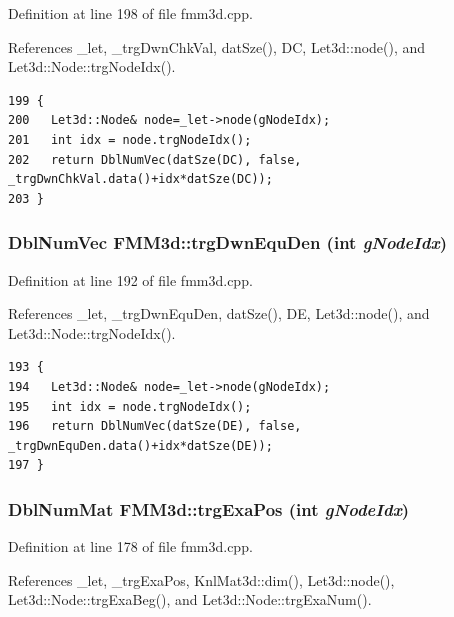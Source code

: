 Definition at line 198 of file fmm3d.cpp.

References \_\-let, \_\-trg\-Dwn\-Chk\-Val, dat\-Sze(), DC, Let3d::node(), and Let3d::Node::trg\-Node\-Idx().

\footnotesize\begin{verbatim}199 {
200   Let3d::Node& node=_let->node(gNodeIdx);
201   int idx = node.trgNodeIdx();
202   return DblNumVec(datSze(DC), false, _trgDwnChkVal.data()+idx*datSze(DC));
203 }
\end{verbatim}\normalsize 


\subsubsection{\setlength{\rightskip}{0pt plus 5cm}Dbl\-Num\-Vec FMM3d::trg\-Dwn\-Equ\-Den (int {\em g\-Node\-Idx})\hspace{0.3cm}{\tt  [protected]}}\label{classFMM3d_3dd1a2adae528cdd846d10c3caba3b98_3dd1a2adae528cdd846d10c3caba3b98}




Definition at line 192 of file fmm3d.cpp.

References \_\-let, \_\-trg\-Dwn\-Equ\-Den, dat\-Sze(), DE, Let3d::node(), and Let3d::Node::trg\-Node\-Idx().

\footnotesize\begin{verbatim}193 {
194   Let3d::Node& node=_let->node(gNodeIdx);
195   int idx = node.trgNodeIdx();
196   return DblNumVec(datSze(DE), false, _trgDwnEquDen.data()+idx*datSze(DE));
197 }
\end{verbatim}\normalsize 


\subsubsection{\setlength{\rightskip}{0pt plus 5cm}Dbl\-Num\-Mat FMM3d::trg\-Exa\-Pos (int {\em g\-Node\-Idx})\hspace{0.3cm}{\tt  [protected]}}\label{classFMM3d_b55afacb81f28ba86ca9509921cc86da_b55afacb81f28ba86ca9509921cc86da}




Definition at line 178 of file fmm3d.cpp.

References \_\-let, \_\-trg\-Exa\-Pos, Knl\-Mat3d::dim(), Let3d::node(), Let3d::Node::trg\-Exa\-Beg(), and Let3d::Node::trg\-Exa\-Num().


